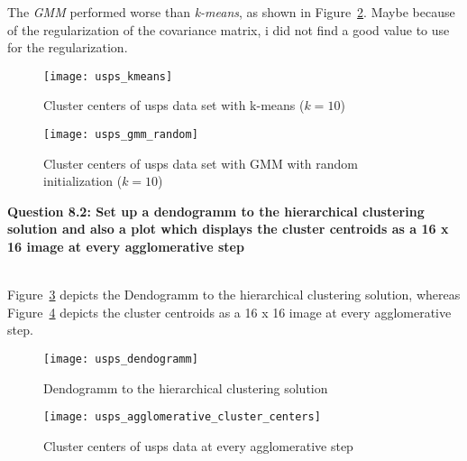 The \textit{GMM} performed worse than \textit{k-means}, as shown in Figure~\ref{fig:usps_gmm_random}. Maybe because of the regularization of the covariance matrix, i did not find a good value to use for the regularization.

\begin{figure}[h!]
	\centering
	\texttt{[image: usps\_kmeans]}
	\caption{Cluster centers of usps data set with k-means ($k=10$)}
	\label{fig:usps_kmeans}
\end{figure}

\begin{figure}[h!]
	\centering
	\texttt{[image: usps\_gmm\_random]}
	\caption{Cluster centers of usps data set with GMM with random initialization ($k=10$)}
	\label{fig:usps_gmm_random}
\end{figure}

\newpage
{\raggedright \textbf{Question 8.2: Set up a dendogramm to the hierarchical clustering solution and also a plot which displays the cluster centroids as a 16 x 16 image at every agglomerative step}}\\

Figure~\ref{fig:usps_dendogramm} depicts the Dendogramm to the hierarchical clustering solution, whereas Figure~\ref{fig:usps_agglomerative_cluster_centers} depicts the cluster centroids as a 16 x 16 image at every agglomerative step.

\begin{figure}[h!]
	\centering
	\texttt{[image: usps\_dendogramm]}
	\caption{Dendogramm to the hierarchical clustering solution}
	\label{fig:usps_dendogramm}
\end{figure}

\begin{figure}[h!]
	\centering
	\texttt{[image: usps\_agglomerative\_cluster\_centers]}
	\caption{Cluster centers of usps data at every agglomerative step}
	\label{fig:usps_agglomerative_cluster_centers}
\end{figure}
